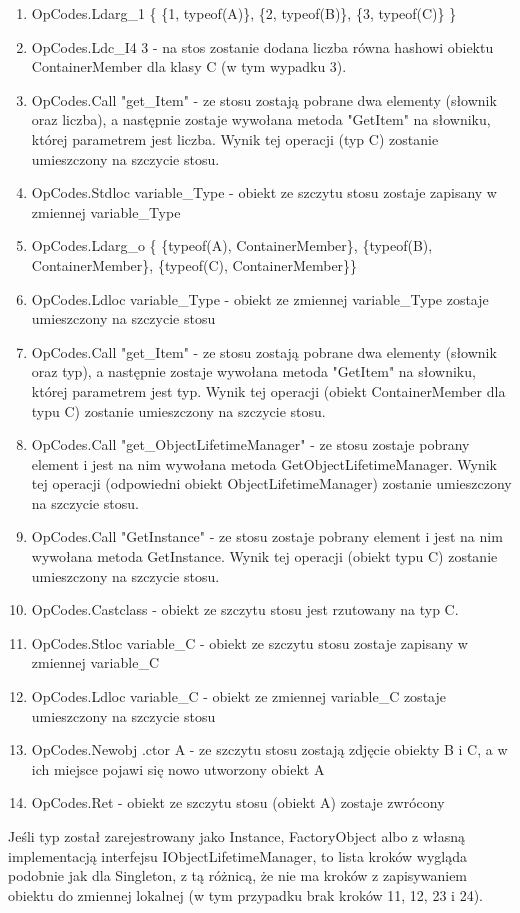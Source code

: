 \documentclass[12pt]{article}
\begin{document}
\begin{enumerate}
	\item OpCodes.Ldarg\_1 \{ \{1, typeof(A)\}, \{2, typeof(B)\}, \{3, typeof(C)\} \}
	\item OpCodes.Ldc\_I4 3 - na stos zostanie dodana liczba równa hashowi obiektu ContainerMember dla klasy C (w tym wypadku 3).
	\item OpCodes.Call "get\_Item" - ze stosu zostają pobrane dwa elementy (słownik oraz liczba), a następnie zostaje wywołana metoda "GetItem" na słowniku, której parametrem jest liczba. Wynik tej operacji (typ C) zostanie umieszczony na szczycie stosu.
	\item OpCodes.Stdloc variable\_Type - obiekt ze szczytu stosu zostaje zapisany w zmiennej variable\_Type
	\item OpCodes.Ldarg\_o  \{ \{typeof(A), ContainerMember\}, \{typeof(B), ContainerMember\}, \{typeof(C), ContainerMember\}\}
	\item OpCodes.Ldloc variable\_Type -  obiekt ze zmiennej variable\_Type zostaje umieszczony na szczycie stosu
	\item OpCodes.Call "get\_Item" - ze stosu zostają pobrane dwa elementy (słownik oraz typ), a następnie zostaje wywołana metoda "GetItem" na słowniku, której parametrem jest typ. Wynik tej operacji (obiekt ContainerMember dla typu C) zostanie umieszczony na szczycie stosu.
	\item OpCodes.Call "get\_ObjectLifetimeManager" - ze stosu zostaje pobrany element i jest na nim wywołana metoda GetObjectLifetimeManager. Wynik tej operacji (odpowiedni obiekt ObjectLifetimeManager) zostanie umieszczony na szczycie stosu.
	\item OpCodes.Call "GetInstance" - ze stosu zostaje pobrany element i jest na nim wywołana metoda GetInstance. Wynik tej operacji (obiekt typu C) zostanie umieszczony na szczycie stosu.
	\item OpCodes.Castclass - obiekt ze szczytu stosu jest rzutowany na typ C.
	\item OpCodes.Stloc variable\_C - obiekt ze szczytu stosu zostaje zapisany w zmiennej variable\_C
	\item OpCodes.Ldloc variable\_C - obiekt ze zmiennej variable\_C zostaje umieszczony na szczycie stosu
	\item OpCodes.Newobj .ctor A - ze szczytu stosu zostają zdjęcie obiekty B i C, a w ich miejsce pojawi się nowo utworzony obiekt A
	\item OpCodes.Ret - obiekt ze szczytu stosu (obiekt A) zostaje zwrócony
\end{enumerate}
Jeśli typ został zarejestrowany jako Instance, FactoryObject albo z własną implementacją interfejsu IObjectLifetimeManager, to lista kroków wygląda podobnie jak dla Singleton, z tą różnicą, że nie ma kroków z zapisywaniem obiektu do zmiennej lokalnej (w tym przypadku brak kroków 11, 12, 23 i 24).
\end{document}
